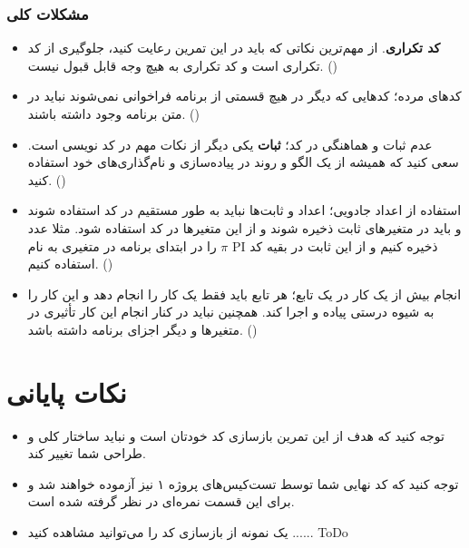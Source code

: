 \documentclass{utap}
\begin{document}
	\subsubsection{مشکلات کلی}
	  \begin{itemize}
	        \item
\textbf{کد تکراری}.
از مهم‌ترین نکاتی که باید در این تمرین رعایت کنید، جلوگیری از کد تکراری است و کد تکراری به هیچ وجه قابل قبول نیست. ()
		\item
کدهای مرده؛ کدهایی که دیگر در هیچ قسمتی از برنامه فراخوانی نمی‌شوند نباید در متن برنامه وجود داشته باشند. ()
		\item
عدم ثبات و هماهنگی در کد؛ \textbf{ثبات} یکی دیگر از نکات مهم در کد نویسی است. سعی کنید که همیشه از یک الگو و روند در پیاده‌سازی و نام‌گذاری‌های خود استفاده کنید. ()
		\item
استفاده از اعداد جادویی؛ اعداد و ثابت‌ها نباید به طور مستقیم در کد استفاده شوند و باید در متغیر‌های ثابت ذخیره شوند و از این متغیر‌ها در کد استفاده شود. مثلا عدد $\pi$ را در ابتدای برنامه در متغیری به نام PI ذخیره کنیم و از این ثابت در بقیه کد استفاده کنیم. ()
		\item
انجام بیش از یک کار در یک تابع؛ هر تابع باید فقط یک کار را انجام دهد و این کار را به شیوه درستی پیاده و اجرا کند. همچنین نباید در کنار انجام این کار تأثیری در متغیرها و دیگر اجزای برنامه داشته باشد. ()

	   \end{itemize}
\section*{نکات پایانی}
	  \begin{itemize}
	        \item
توجه کنید که هدف از این تمرین بازسازی کد خودتان است و نباید ساختار کلی و طراحی شما تغییر کند.
		\item
توجه کنید که کد نهایی شما توسط تست‌کیس‌های پروژه ۱ نیز آزموده خواهند شد و برای این قسمت نمره‌ای در نظر گرفته شده است.
		\item
یک نمونه از بازسازی کد را می‌توانید مشاهده کنید ...... ToDo

	  \end{itemize}
\end{document}
